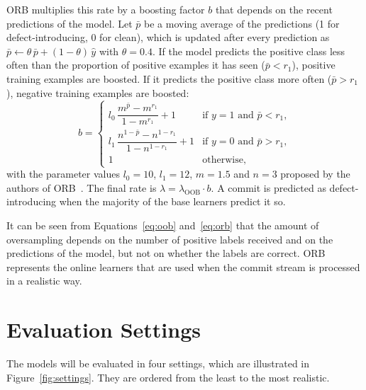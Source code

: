 \documentclass[12pt,a4paper,oneside]{report}
\begin{document}
ORB multiplies this rate by a boosting factor $b$ that depends on the recent
predictions of the model. Let $\bar{p}$ be a moving average of the
predictions (1 for defect-introducing, 0 for clean), which is updated after
every prediction as $\bar{p} \leftarrow \theta\,\bar{p} + (1-\theta)\,\hat{y}$
with $\theta = 0.4$. If the model predicts the positive class less often than
the proportion of positive examples it has seen ($\bar{p} < r_1$), positive
training examples are boosted. If it predicts the positive class more often
($\bar{p} > r_1$), negative training examples are boosted:
\begin{equation}
b =
\begin{cases}
l_0\,\dfrac{m^{\bar{p}} - m^{r_1}}{1 - m^{r_1}} + 1 & \text{if } y=1 \text{ and } \bar{p} < r_1,\\[2.2ex]
l_1\,\dfrac{n^{1-\bar{p}} - n^{1-r_1}}{1 - n^{1-r_1}} + 1 & \text{if } y=0 \text{ and } \bar{p} > r_1,\\[1.6ex]
1 & \text{otherwise,}
\end{cases}
\label{eq:orb}
\end{equation}
with the parameter values $l_0 = 10$, $l_1 = 12$, $m = 1.5$ and $n = 3$
proposed by the authors of ORB~\cite{cabral2019orb}. The final rate is
$\lambda = \lambda_{\mathrm{OOB}} \cdot b$. A commit is predicted as
defect-introducing when the majority of the base learners predict it so.

It can be seen from Equations~\ref{eq:oob} and~\ref{eq:orb} that the amount
of oversampling depends on the number of positive labels received and on the
predictions of the model, but not on whether the labels are correct. ORB
represents the online learners that are used when the commit stream is
processed in a realistic way.

\section{Evaluation Settings}\label{sec:settings}

The models will be evaluated in four settings, which are illustrated in
Figure~\ref{fig:settings}. They are ordered from the least to the most
realistic.
\end{document}
